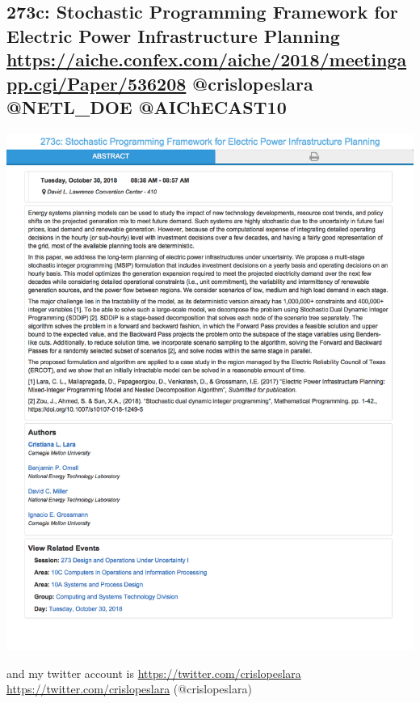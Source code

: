 \documentclass[11pt]{article}
\begin{document}
\subsection{273c: Stochastic Programming Framework for Electric Power Infrastructure Planning \url{https://aiche.confex.com/aiche/2018/meetingapp.cgi/Paper/536208} @crislopeslara @NETL\_DOE @AIChECAST10}
\label{sec:org62df40f}
\begin{center}
\includegraphics[width=.9\linewidth]{./536208.png}
\end{center}
and my twitter account is \url{https://twitter.com/crislopeslara} \url{https://twitter.com/crislopeslara} (@crislopeslara)
\end{document}
